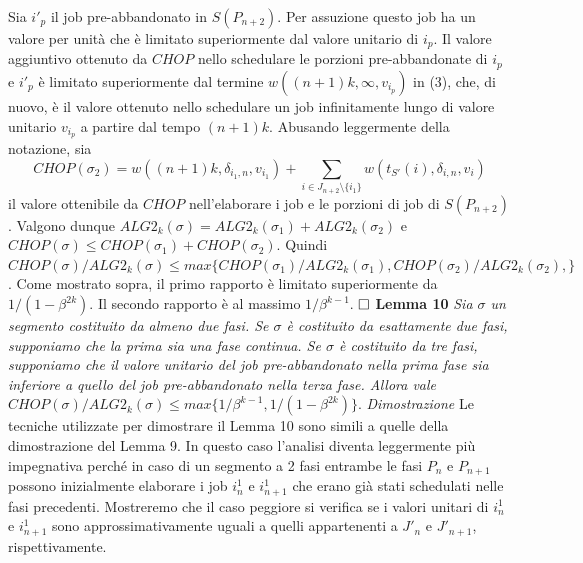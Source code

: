 \documentclass[12pt]{article}
\begin{document}
Sia $i'_{p}$ il job pre-abbandonato in $S(P_{n+2})$. Per assuzione questo job ha un valore per unità che è limitato superiormente dal valore unitario di $i_{p}$. Il valore aggiuntivo ottenuto da $CHOP$ nello schedulare le porzioni pre-abbandonate di $i_{p}$ e $i'_{p}$ è limitato superiormente dal termine $w ((n + 1) k, \infty, v_{i_{p}})$ in (3), che, di nuovo, è il valore ottenuto nello schedulare un job infinitamente lungo di valore unitario $v_{i_{p}}$ a partire dal tempo $(n + 1) k$. Abusando leggermente della notazione, sia
$$CHOP(\sigma_{2}) = w ((n + 1) k, \delta_{i_{1}, n}, v_{i_{1}}) + \sum_{i \in J_{n+2} \setminus \{i_{1}\}} w (t_{S'}(i), \delta_{i, n}, v_{i})$$ 
il valore ottenibile da $CHOP$ nell'elaborare i job e le porzioni di job di $S(P_{n+2})$. Valgono dunque $ALG2_{k} (\sigma) = ALG2_{k} (\sigma_{1}) + ALG2_{k} (\sigma_{2})$ e $CHOP(\sigma) \leq CHOP (\sigma_{1}) + CHOP (\sigma_{2})$. Quindi $CHOP (\sigma) / ALG2_{k} (\sigma) \leq max \{CHOP(\sigma_{1}) / ALG2_{k}(\sigma_{1}), CHOP(\sigma_{2}) / ALG2_{k}(\sigma_{2}),\}$. Come mostrato sopra, il primo rapporto è limitato superiormente da $1 / (1 - \beta^{2k})$. Il secondo rapporto è al massimo $1 / \beta^{k - 1}$. $\hfill \square$
\newline \newline
\textbf{Lemma 10}
\textit{Sia $\sigma$ un segmento costituito da almeno due fasi. Se $\sigma$ è costituito da esattamente due fasi, supponiamo che la prima sia una fase continua. Se $\sigma$ è costituito da tre fasi, supponiamo che il valore unitario del job pre-abbandonato nella prima fase sia inferiore a quello del job pre-abbandonato nella terza fase. Allora vale $CHOP(\sigma) / ALG2_{k}(\sigma) \leq max \{1 / \beta^{k-1}, 1 / (1 - \beta^{2k})\}.$}
\newline \newline
\textit{Dimostrazione}
Le tecniche utilizzate per dimostrare il Lemma 10 sono simili a quelle della dimostrazione del Lemma 9. In questo caso l'analisi diventa leggermente più impegnativa perché in caso di un segmento a 2 fasi entrambe le fasi $P_{n}$ e $P_{n + 1}$ possono inizialmente elaborare i job $i_{n}^{1}$ e $i_{n+1}^{1}$ che erano già stati schedulati nelle fasi precedenti. Mostreremo che il caso peggiore si verifica se i valori unitari di $i_{n}^{1}$ e $i_{n+1}^{1}$ sono approssimativamente uguali a quelli appartenenti a $J'_{n}$ e $J'_{n+1}$, rispettivamente. 
\end{document}
